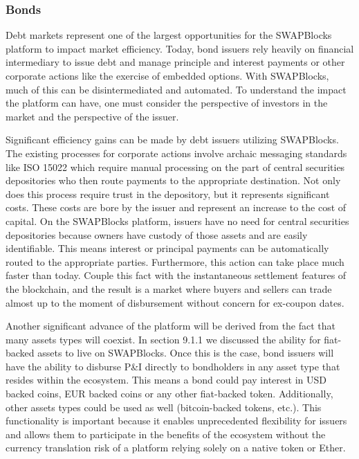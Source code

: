 \documentclass[12pt]{article}
\begin{document}
\subsubsection{Bonds}
Debt markets represent one of the largest opportunities for the SWAPBlocks platform to impact market efficiency. 
Today, bond issuers rely heavily on financial intermediary to issue debt and manage principle and interest payments 
or other corporate actions like the exercise of embedded options. With SWAPBlocks, much of this can be disintermediated 
and automated. To understand the impact the platform can have, one must consider the perspective of investors in 
the market and the perspective of the issuer.

Significant efficiency gains can be made by debt issuers utilizing SWAPBlocks. The existing processes for 
corporate actions involve archaic messaging standards like ISO 15022 which require manual processing on the part of 
central securities depositories who then route payments to the appropriate destination. Not only does this process 
require trust in the depository, but it represents significant costs. These costs are bore by the issuer and represent 
an increase to the cost of capital. On the SWAPBlocks platform, issuers have no need for central securities depositories 
because owners have custody of those assets and are easily identifiable. This means interest or principal payments can be 
automatically routed to the appropriate parties. Furthermore, this action can take place much faster than today. Couple 
this fact with the instantaneous settlement features of the blockchain, and the result is a market where buyers 
and sellers can trade almost up to the moment of disbursement without concern for ex-coupon dates.

Another significant advance of the platform will be derived from the fact that many assets types will coexist. In 
section 9.1.1 we discussed the ability for fiat-backed assets to live on SWAPBlocks. Once this is the case, bond 
issuers will have the ability to disburse P\&I directly to bondholders in any asset type that resides within the ecosystem. 
This means a bond could pay interest in USD backed coins, EUR backed coins or any other fiat-backed token. 
Additionally, other assets types could be used as well (bitcoin-backed tokens, etc.). This functionality is important 
because it enables unprecedented flexibility for issuers and allows them to participate in the benefits of the 
ecosystem without the currency translation risk of a platform relying solely on a native token or Ether.
\end{document}
